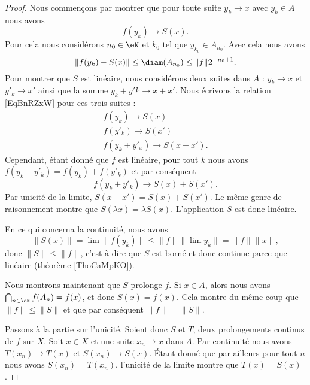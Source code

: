 \begin{proof}
    Nous commençons par montrer que pour toute suite \( y_k\to x\) avec \( y_k\in A\) nous avons 
    \begin{equation}    \label{EqBnRZxW}
        f(y_k)\to S(x).
    \end{equation}
    Pour cela nous considérons \( n_0\in \eN\) et \( k_0\) tel que \( y_{k_0}\in A_{n_0}\). Avec cela nous avons
    \begin{equation}
        \| f(y_k)-S(x) \|\leq \diam(A_{n_0})\leq \| f \|2^{-n_0+1}.
    \end{equation}
    Pour montrer que \( S\) est linéaire, nous considérons deux suites dans \( A\) : \( y_k\to x\) et \( y'_k\to x'\) ainsi que la somme \( y_k+y'k\to x+x'\). Nous écrivons la relation \eqref{EqBnRZxW} pour ces trois suites :
    \begin{subequations}
        \begin{align}
            f(y_k)\to S(x)\\
            f(y'_k)\to S(x')\\
            f(y_k+y'_x)\to S(x+x').
        \end{align}
    \end{subequations}
    Cependant, étant donné que \( f\) est linéaire, pour tout \( k\) nous avons \( f(y_k+y'_k)=f(y_k)+f(y'_k)\) et par conséquent
    \begin{equation}
        f(y_k+y'_k)\to S(x)+S(x').
    \end{equation}
    Par unicité de la limite, \( S(x+x')=S(x)+S(x')\). Le même genre de raisonnement montre que \( S(\lambda x)=\lambda S(x)\). L'application \( S\) est donc linéaire.

    En ce qui concerna la continuité, nous avons
    \begin{equation}
            \| S(x) \|=\lim\| f(y_k) \|\leq \| f \|\| \lim y_k \|=\| f \|\| x \|,
    \end{equation}
    donc \( \| S \|\leq \| f \|\), c'est à dire que \( S\) est borné et donc continue parce que linéaire (théorème \ref{ThoCaMpKO}).

    Nous montrons maintenant que \( S\) prolonge \( f\). Si \( x\in A\), alors nous avons \( \bigcap_{n\in \eN}f(A_n)=f(x)\), et donc \( S(x)=f(x)\). Cela montre du même coup que \( \| f \|\leq \| S \|\) et que par conséquent \( \| f \|=\| S \|\).

    Passons à la partie sur l'unicité. Soient donc \( S\) et \( T\), deux prolongements continus de \( f\) sur \( X\). Soit \( x\in X\) et une suite \( x_n\to x\) dans \( A\). Par continuité nous avons \( T(x_n)\to T(x)\) et \( S(x_n)\to S(x)\). Étant donné que par ailleurs pour tout \( n\) nous avons \( S(x_n)=T(x_n)\), l'unicité de la limite montre que \( T(x)=S(x)\).
\end{proof}

